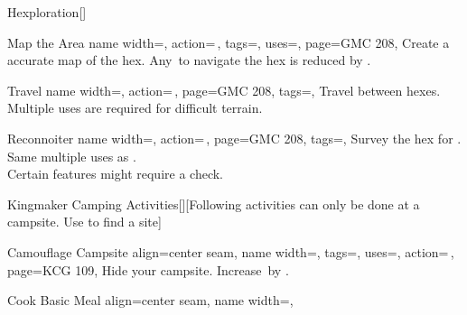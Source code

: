 \begin{PageFront}
\begin{Tables}{\frontTableHeight}
\begin{Table}{Hexploration}[]
\begin{entry}{Map the Area}{%
                name width=\activityLength,%
                action=\,,
                tags=\Concentrate,
                uses=\Survival,
                page=GMC 208,
            }
                Create a accurate map of the hex. Any \DC\,to navigate the hex is reduced by . \hfill{}
            \end{entry}
            \begin{entry}{Travel}{%
                name width=\activityLength,%
                action=\,,
                page=GMC 208,
                tags=\Move,
            }
                Travel between hexes. Multiple uses are required for difficult terrain.\hfill {}\\
            \end{entry}
            \begin{entry}{Reconnoiter}{%
                name width=\activityLength,%
                action=\,,
                page=GMC 208,
                tags=\Concentrate,
            }
                Survey the hex for . Same multiple uses as .\hfill {}\\
                Certain features might require a check.
            \end{entry}
        \end{Table}%
        \vfill
        \begin{Table}{Kingmaker Camping Activities}[][Following activities can only be done at a campsite. Use
         to find a site]
            \begin{entry}{Camouflage Campsite}{%
                align=center seam,
                name width=\activityLength,%
                tags=\Manipulate,
                uses={\Stealth[tags={T,S}]},
                action=\,,
                page=KCG 109,
            }
                Hide your campsite. Increase  \DC\,by .\hfill{}\\
                \phant{}
            \end{entry}
            \begin{entry}{Cook Basic Meal}{%
                align=center seam,
                name width=\activityLength,%
}
\end{entry}
\end{Table}
\end{Tables}
\end{PageFront}
